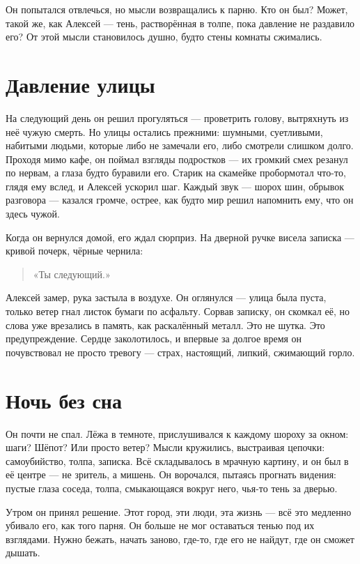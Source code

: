 \documentclass[12pt,a4paper]{book}
\begin{document}
Он попытался отвлечься, но мысли возвращались к парню. Кто он был? Может, такой же, как Алексей — тень, растворённая в толпе, пока давление не раздавило его? От этой мысли становилось душно, будто стены комнаты сжимались.

\section{Давление улицы}

На следующий день он решил прогуляться — проветрить голову, вытряхнуть из неё чужую смерть. Но улицы остались прежними: шумными, суетливыми, набитыми людьми, которые либо не замечали его, либо смотрели слишком долго. Проходя мимо кафе, он поймал взгляды подростков — их громкий смех резанул по нервам, а глаза будто буравили его. Старик на скамейке пробормотал что-то, глядя ему вслед, и Алексей ускорил шаг. Каждый звук — шорох шин, обрывок разговора — казался громче, острее, как будто мир решил напомнить ему, что он здесь чужой.

Когда он вернулся домой, его ждал сюрприз. На дверной ручке висела записка — кривой почерк, чёрные чернила: 

\begin{quote}
«Ты следующий.»
\end{quote}

Алексей замер, рука застыла в воздухе. Он оглянулся — улица была пуста, только ветер гнал листок бумаги по асфальту. Сорвав записку, он скомкал её, но слова уже врезались в память, как раскалённый металл. Это не шутка. Это предупреждение. Сердце заколотилось, и впервые за долгое время он почувствовал не просто тревогу — страх, настоящий, липкий, сжимающий горло.

\section{Ночь без сна}

Он почти не спал. Лёжа в темноте, прислушивался к каждому шороху за окном: шаги? Шёпот? Или просто ветер? Мысли кружились, выстраивая цепочки: самоубийство, толпа, записка. Всё складывалось в мрачную картину, и он был в её центре — не зритель, а мишень. Он ворочался, пытаясь прогнать видения: пустые глаза соседа, толпа, смыкающаяся вокруг него, чья-то тень за дверью.

Утром он принял решение. Этот город, эти люди, эта жизнь — всё это медленно убивало его, как того парня. Он больше не мог оставаться тенью под их взглядами. Нужно бежать, начать заново, где-то, где его не найдут, где он сможет дышать.
\end{document}

